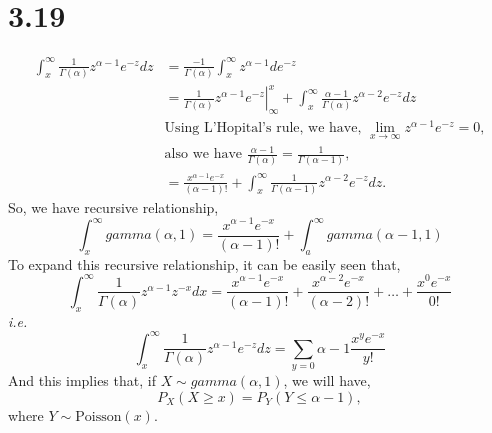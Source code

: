 \documentclass[letter]{article}
\begin{document}
    \section*{3.19}
    \begin{align*}
    \int_x^\infty \frac{1}{\Gamma(\alpha)} z^{\alpha-1} e^{-z} dz & =
    \frac{-1}{\Gamma(\alpha)} \int_x^\infty z^{\alpha-1} d e^{-z} \\
    & = \left. \frac{1}{\Gamma(\alpha)} z^{\alpha-1}e^{-z} \right|^x_\infty + 
    \int_x^\infty \frac{\alpha-1}{\Gamma(\alpha)} z^{\alpha-2}e^{-z} dz\\
    & \text{Using L'Hopital's rule, we have, $\lim_{x\to \infty} z^{\alpha-1} e^{-z} = 0$},\\
    & \text{also we have $\frac{\alpha-1}{\Gamma(\alpha)} = \frac{1}{\Gamma(\alpha-1)}$}, \\
    & = \frac{x^{\alpha-1}e^{-x}}{(\alpha-1)!} + \int_x^\infty \frac{1}{\Gamma(\alpha-1)} z^{\alpha-2} e^{-z}dz.
    \end{align*}
    So, we have recursive relationship,
    \[
    \int_x^\infty gamma(\alpha, 1) = \frac{x^{\alpha-1}e^{-x}}{(\alpha-1)!}  + \int_a^\infty gamma(\alpha-1, 1)
    \]
    To expand this recursive relationship, it can be easily seen that,
    \[
    \int_x^\infty \frac{1}{\Gamma(\alpha)} z^{\alpha-1} z^{-x} dx = \frac{x^{\alpha-1}e^{-x}}{(\alpha-1)!} + \frac{x^{\alpha-2}e^{-x}}{(\alpha-2)!} + \dots + \frac{x^{0}e^{-x}}{0!}
    \]
    \emph{i.e.}
    \[
    \int_x^\infty \frac{1}{\Gamma(\alpha)} z^{\alpha-1} e^{-z} dz = \sum_{y=0}{\alpha-1} \frac{x^y e^{-x}}{y!}
    \]
    And this implies that, if $X \sim gamma(\alpha, 1)$, we will have,
    \[
    P_X(X \ge x) = P_Y(Y \le \alpha-1),
    \]
    where $Y \sim \text{Poisson}(x)$.
\end{document}
